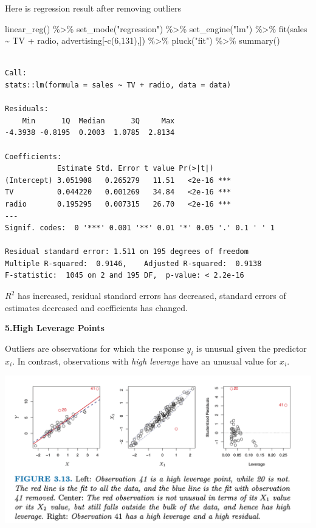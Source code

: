 \documentclass[
  letterpaper,
  DIV=11,
  numbers=noendperiod]{scrreprt}
\newenvironment{Shaded}{\begin{snugshade}}{\end{snugshade}}
\newcommand{\DecValTok}[1]{\textcolor[rgb]{0.47,0.16,0.63}{#1}}
\newcommand{\FunctionTok}[1]{\textcolor[rgb]{0.02,0.16,0.49}{#1}}
\newcommand{\NormalTok}[1]{\textcolor[rgb]{0.33,0.33,0.33}{#1}}
\newcommand{\SpecialCharTok}[1]{\textcolor[rgb]{0.00,0.46,0.62}{#1}}
\newcommand{\StringTok}[1]{\textcolor[rgb]{0.00,0.50,0.00}{#1}}
\begin{document}
Here is regression result after removing outliers

\begin{Shaded}
\begin{Highlighting}[]
\FunctionTok{linear\_reg}\NormalTok{() }\SpecialCharTok{\%\textgreater{}\%} 
  \FunctionTok{set\_mode}\NormalTok{(}\StringTok{"regression"}\NormalTok{) }\SpecialCharTok{\%\textgreater{}\%} 
  \FunctionTok{set\_engine}\NormalTok{(}\StringTok{"lm"}\NormalTok{) }\SpecialCharTok{\%\textgreater{}\%} 
  \FunctionTok{fit}\NormalTok{(sales }\SpecialCharTok{\textasciitilde{}}\NormalTok{ TV }\SpecialCharTok{+}\NormalTok{ radio, advertising[}\SpecialCharTok{{-}}\FunctionTok{c}\NormalTok{(}\DecValTok{6}\NormalTok{,}\DecValTok{131}\NormalTok{),]) }\SpecialCharTok{\%\textgreater{}\%} 
  \FunctionTok{pluck}\NormalTok{(}\StringTok{"fit"}\NormalTok{) }\SpecialCharTok{\%\textgreater{}\%} 
  \FunctionTok{summary}\NormalTok{()}
\end{Highlighting}
\end{Shaded}

\begin{verbatim}

Call:
stats::lm(formula = sales ~ TV + radio, data = data)

Residuals:
    Min      1Q  Median      3Q     Max 
-4.3938 -0.8195  0.2003  1.0785  2.8134 

Coefficients:
            Estimate Std. Error t value Pr(>|t|)    
(Intercept) 3.051908   0.265279   11.51   <2e-16 ***
TV          0.044220   0.001269   34.84   <2e-16 ***
radio       0.195295   0.007315   26.70   <2e-16 ***
---
Signif. codes:  0 '***' 0.001 '**' 0.01 '*' 0.05 '.' 0.1 ' ' 1

Residual standard error: 1.511 on 195 degrees of freedom
Multiple R-squared:  0.9146,    Adjusted R-squared:  0.9138 
F-statistic:  1045 on 2 and 195 DF,  p-value: < 2.2e-16
\end{verbatim}

\(R^2\) has increased, residual standard errors has decreased, standard
errors of estimates decreased and coefficients has changed.

\textbf{5.High Leverage Points}

Outliers are observations for which the response \(y_i\) is unusual
given the predictor \(x_i\). In contrast, observations with \emph{high
leverage} have an unusual value for \(x_i\).

\includegraphics{fig3.13.png}
\end{document}
